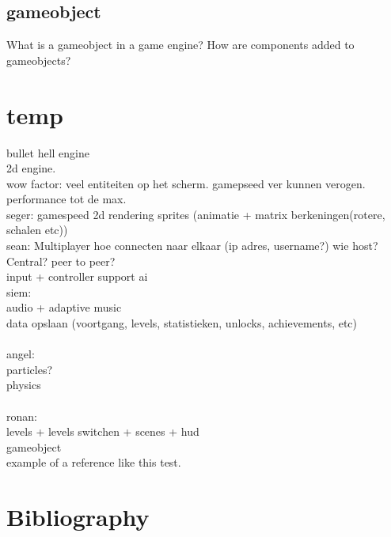 \documentclass{article} %
\begin{document}
\subsection{gameobject}
What is a gameobject in a game engine?
How are components added to gameobjects?

\newpage

\section{temp}
bullet hell engine
\\
2d engine.
\\
wow factor: veel entiteiten op het scherm. gamepseed ver kunnen verogen.
performance tot de max.
\\
seger:
gamespeed
2d rendering
sprites (animatie + matrix berkeningen(rotere, schalen etc))
\\
sean:
Multiplayer
hoe connecten naar elkaar (ip adres, username?)
wie host? Central? peer to peer?
\\
input + controller support
ai
\\
siem:\\
audio + adaptive music\\
data opslaan (voortgang, levels, statistieken, unlocks, achievements, etc)\\
\\
angel:\\
particles?\\
physics\\
\\
ronan:\\
levels + levels switchen + scenes + hud \\
gameobject
\\

example of a reference \cite{author2020} like this test.


\newpage

\section{Bibliography}
\printbibliography %
\newpage
\end{document}
